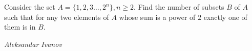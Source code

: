 Consider the set $A=\{1,2,3\ldots ,2^n\}, n\ge 2$. Find the number of subsets $B$ of $A$ such that for any two elements of $A$ whose sum is a power of $2$ exactly one of them is in $B$.

\textit{Aleksandar Ivanov}